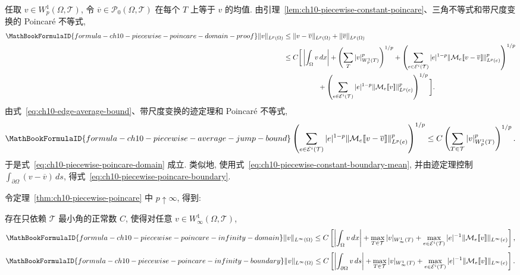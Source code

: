 \begin{Proof}
任取 $v\in W_p^1(\Omega,\mathcal T)$, 令 $\overline v\in\mathcal P_0(\Omega,\mathcal T)$ 在每个 $T$ 上等于 $v$ 的均值. 由引理~\ref{lem:ch10-piecewise-constant-poincare}、三角不等式和带尺度变换的 Poincaré 不等式,
\begin{align*}
\MathBookFormulaID{formula-ch10-piecewise-poincare-domain-proof}
\|v\|_{L^p(\Omega)}
&\leq\|v-\overline v\|_{L^p(\Omega)}+\|\overline v\|_{L^p(\Omega)}\\
&\leq C\bigg[\left|\int_\Omega v\,dx\right|
+\left(\sum_T|v|_{W_p^1(T)}^p\right)^{1/p}
+\left(\sum_{e\in\mathcal E^i(\mathcal T)}|e|^{1-p}
\|\mathcal M_e[\![v-\overline v]\!]\|_{L^p(e)}^p\right)^{1/p}\\
&\hspace{5em}+\left(\sum_{e\in\mathcal E^i(\mathcal T)}|e|^{1-p}
\|\mathcal M_e[\![v]\!]\|_{L^p(e)}^p\right)^{1/p}\bigg].
\end{align*}
由式~\eqref{eq:ch10-edge-average-bound}、带尺度变换的迹定理和 Poincaré 不等式,
\[
\MathBookFormulaID{formula-ch10-piecewise-average-jump-bound}
\left(\sum_{e\in\mathcal E^i(\mathcal T)}|e|^{1-p}
\|\mathcal M_e[\![v-\overline v]\!]\|_{L^p(e)}^p\right)^{1/p}
\leq C\left(\sum_{T\in\mathcal T}|v|_{W_p^1(T)}^p\right)^{1/p}.
\]
于是式~\eqref{eq:ch10-piecewise-poincare-domain} 成立. 类似地, 使用式~\eqref{eq:ch10-piecewise-constant-boundary-mean}, 并由迹定理控制 $\int_{\partial\Omega}(v-\overline v)\,ds$, 得式~\eqref{eq:ch10-piecewise-poincare-boundary}.
\end{Proof}

令定理~\ref{thm:ch10-piecewise-poincare} 中 $p\uparrow\infty$, 得到:

\begin{Theorem}
\label{thm:ch10-piecewise-poincare-infinity}
存在只依赖 $\mathcal T$ 最小角的正常数 $C$, 使得对任意 $v\in W_\infty^1(\Omega,\mathcal T)$,
\[
\MathBookFormulaID{formula-ch10-piecewise-poincare-infinity-domain}
\|v\|_{L^\infty(\Omega)}\leq C\left[
\left|\int_\Omega v\,dx\right|+\max_{T\in\mathcal T}|v|_{W_\infty^1(T)}
+\max_{e\in\mathcal E^i(\mathcal T)}|e|^{-1}
\|\mathcal M_e[\![v]\!]\|_{L^\infty(e)}\right],
\]
\[
\MathBookFormulaID{formula-ch10-piecewise-poincare-infinity-boundary}
\|v\|_{L^\infty(\Omega)}\leq C\left[
\left|\int_{\partial\Omega}v\,ds\right|+\max_{T\in\mathcal T}|v|_{W_\infty^1(T)}
+\max_{e\in\mathcal E^i(\mathcal T)}|e|^{-1}
\|\mathcal M_e[\![v]\!]\|_{L^\infty(e)}\right].
\]
\end{Theorem}

